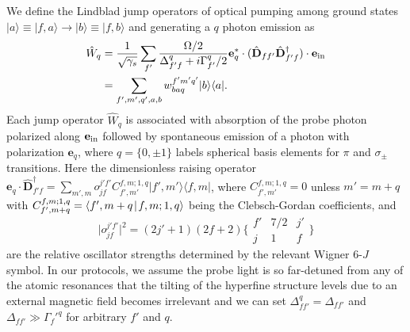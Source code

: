 \documentclass[pra,twocolumn,floatfix,superscriptaddress]{revtex4-1} %
\def\bra#1{\langle{#1}\rvert}%
\def\ket#1{\lvert{#1}\rangle}%
\def\Braket#1#2{\mathinner{\langle{#1}\! \mid\! {#2} \rangle}}
\begin{document}
\begin{appendix}
We define the Lindblad jump operators of optical pumping among ground states $\ket{a}\equiv \ket{f,a} \rightarrow \ket{b}\equiv \ket{f,b}$ and generating a $q$ photon emission as~\cite{Deutsch2010a}
	\begin{align}\label{Eq::Wq_Faraday}
		\hat{W}_q &= \frac{1}{\sqrt{\gamma_s}}\sum_{f'}\frac{\Omega/2}{\Delta_{f'f}^q+i\Gamma_{f'}^q/2}\mathbf{e}_q^*\cdot(\hat{\mathbf{D}}_{ff'}  \hat{\mathbf{D}}^\dagger_{f'f} )\cdot\mathbf{e}_{\rm in}\\
		&=\sum_{f',m',q',a,b} w_{baq }^{f'm'q'}\ket{b}\bra{a}.
	\end{align}
Each jump operator $\hat{W}_q$ is associated with absorption of the probe photon polarized along $ \mathbf{e}_{\rm in} $ followed by spontaneous emission of a photon with polarization $ \mathbf{e}_q $, where $q= \{0,\pm 1\}$ labels spherical basis elements for $\pi$ and $ \sigma_\pm$ transitions. 
Here the dimensionless raising operator $ \mathbf{e}_q\cdot\hat{\mathbf{D}}_{f'f}^\dagger= \sum_{m',m} o_{jf}^{j'f'} C_{f',m'}^{f,m;1, q}\ket{f',m'}\bra{f,m} $,
where $ C_{f',m'}^{f,m;1, q}=0 $ unless $ m'=m+q $ with $ C_{f',m+q}^{f,m;1, q}=\Braket{f',m+q}{f,m;1,q}$ being the Clebsch-Gordan coefficients, and
\begin{equation}
\big| o_{jf}^{j'f'} \big|^2=(2j'+1)(2f+2) \bigg\{
\begin{array}{ccc}
f' & 7/2 & j' \\
 j & 1 & f
 \end{array}
 \bigg\}
\end{equation}
are the relative oscillator strengths determined by the relevant Wigner 6-$J$ symbol.
In our protocols, we assume the probe light is so far-detuned from any of the atomic resonances that the tilting of the hyperfine structure levels due to an external magnetic field becomes irrelevant and we can set $ \Delta_{ff'}^q=\Delta_{ff'} $ and $ \Delta_{ff'}\gg \Gamma_f'^q $ for arbitrary $ f' $ and $ q $.



\end{appendix}
\end{document}
